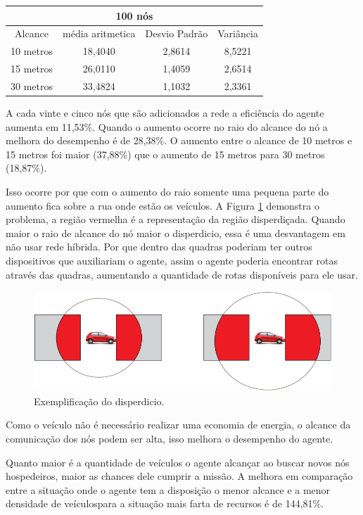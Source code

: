 \begin{table}[!htb]
\begin{minipage}{.5\linewidth}
\begin{tabular}{|c|c|c|c|}
			\multicolumn{4}{|c|}{100 nós} \\ \hline
			Alcance   & média aritmetica &	Desvio Padrão &	Variância  \\ \hline
			10 metros &	18,4040	& 2,8614 & 8,5221  \\ \hline
			15 metros &	26,0110	& 1,4059 & 2,6514  \\ \hline
			30 metros &	33,4824	& 1,1032 & 2,3361 \\ \hline

		\end{tabular}

	    \end{minipage} 
	\end{table}

A cada vinte e cinco nós que são adicionados a rede a eficiência do agente aumenta em 11,53\%. Quando o aumento ocorre no raio do alcance do nó a melhora do desempenho é de 28,38\%. O aumento entre o alcance de 10 metros e 15 metros foi maior (37,88\%) que o aumento de 15 metros para 30 metros (18,87\%). 

Isso ocorre por que com o aumento do raio somente uma pequena parte do aumento fica sobre a rua onde estão os veículos. A Figura \ref{fig:problemaDisperdicio} demonstra o problema, a região vermelha é a representação da região disperdiçada. Quando maior o raio de alcance do nó maior o disperdicio, essa é uma desvantagem em não usar rede híbrida. Por que dentro das quadras poderiam ter outros dispositivos que auxiliariam o agente, assim o agente poderia encontrar rotas através das quadras, aumentando a quantidade de rotas disponíveis para ele usar.

\begin{figure}[htbp]
		\centering
		\includegraphics[scale=0.5]{resultados/figuras/problemaDisperdicio.pdf}
		\caption{Exemplificação do disperdicio.}
		\label{fig:problemaDisperdicio}
	\end{figure}

Como o veículo não é necessário realizar uma economia de energia, o alcance da comunicação dos nós podem ser alta, isso melhora o desempenho do agente. 

Quanto maior é a quantidade de veículos o agente alcançar ao buscar novos nós hospedeiros, maior as chances dele cumprir a missão. A melhora em comparação entre a situação onde o agente tem a disposição o menor alcance e a menor densidade de veículospara a situação mais farta de recursos é de 144,81\%.   